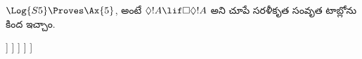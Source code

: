 \documentclass[../../../include/open-logic-section]{subfiles}
\begin{document}
\begin{ex}
  $\Log{S5} \Proves \Ax{5}$, అంటే
  $\Diamond!A \lif \Box\Diamond!A$ అని చూపే సరళీకృత
  సంవృత టాబ్లోను కింద ఇచ్చాం.
  \begin{oltableau}
    [\pFmla{\False}{\Diamond\formula{A} \lif \Box\Diamond \formula{A}}{1},
      just = \TAss
      [\pFmla{\True}{\Diamond \formula{A}}{1}, just = {\TRule{\False}{\lif}[1]}
        [\pFmla{\False}{\Box\Diamond \formula{A}}{1},
          just = {\TRule{\False}{\lif}[1]}
          [\pFmla{\False}{\Diamond \formula{A}}{2},
            just = {\TRule{\False}{\Box}[3]}
            [\pFmla{\True}{\formula{A}}{3},
              just = {\TRule{\True}{\Diamond}[2]}
                [\pFmla{\False}{\formula{A}}{3},
                  just = {\TRule{\False}{\Diamond}[4]}, close]
            ]
          ]
        ]
      ]
    ]
  \end{oltableau}
\end{ex}
\end{document}

